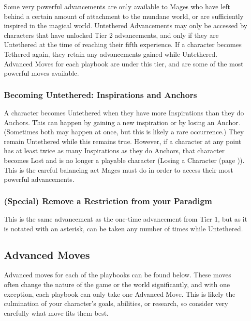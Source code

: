 \documentclass[
  oneside,
  statementpaper,
  9pt]{memoir}
\begin{document}
Some very powerful advancements are only available to Mages who have
left behind a certain amount of attachment to the mundane world, or are
sufficiently inspired in the magical world. Untethered Advancements may
only be accessed by characters that have unlocked Tier 2 advancements,
and only if they are Untethered at the time of reaching their fifth
experience. If a character becomes Tethered again, they retain any
advancements gained while Untethered. Advanced Moves for each playbook
are under this tier, and are some of the most powerful moves available.

\hypertarget{becoming-untethered-inspirations-and-anchors}{%
\subsubsection{Becoming Untethered: Inspirations and
Anchors}\label{becoming-untethered-inspirations-and-anchors}}

A character becomes Untethered when they have more Inspirations than they do Anchors. This can happen by gaining a new inspiration or by losing an Anchor. (Sometimes both may happen at once, but this is likely a rare occurrence.) They remain Untethered while this remains true. However, if a character at any point has at least twice as many Inspirations as they do Anchors, that character becomes Lost and is no longer a playable character (Losing a Character (page \pageref{Losing a Character})). This is the careful balancing act Mages must do in order to access their most powerful advancements.

\hypertarget{special-remove-a-restriction-from-your-paradigm}{%
\subsubsection{(Special) Remove a Restriction from your
Paradigm}\label{special-remove-a-restriction-from-your-paradigm}}

This is the same advancement as the one-time advancement from Tier 1,
but as it is notated with an asterisk, can be taken any number of times
while Untethered.

\label{Advanced Moves}

\hypertarget{advanced-moves-1}{%
\subsection{Advanced Moves}\label{advanced-moves-1}}

Advanced moves for each of the playbooks can be found below. These moves
often change the nature of the game or the world significantly, and with
one exception, each playbook can only take one Advanced Move. This is
likely the culmination of your character's goals, abilities, or
research, so consider very carefully what move fits them best.
\end{document}
